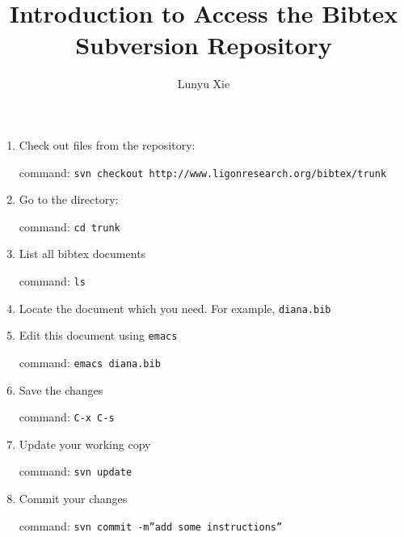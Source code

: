 \documentclass{article}
\begin{document}
\title{Introduction to Access the Bibtex Subversion Repository}
\author{Lunyu Xie}
\maketitle

\begin{enumerate}
\item{Check out files from the repository:

command: \texttt{svn checkout http://www.ligonresearch.org/bibtex/trunk}}

\item{Go to the directory:

command: \texttt{cd trunk}}


\item{List all bibtex documents

command: \texttt{ls}}


\item{Locate the document which you need. For example, \texttt{diana.bib}}


\item{Edit this document using \texttt{emacs}

command: \texttt{emacs diana.bib}}


\item{Save the changes

command: \texttt{C-x C-s}}


\item{Update your working copy

command: \texttt{svn update}}


\item{Commit your changes

command: \texttt{svn commit -m''add some instructions''}}

\end{enumerate}
\end{document}
